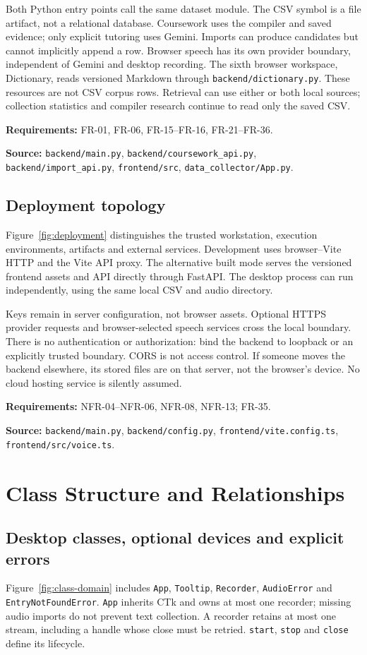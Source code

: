 \documentclass[11pt,a4paper]{article}
\newcommand{\viewtrace}[2]{\par\smallskip\noindent\textbf{Requirements:} #1.\par
  \noindent\textbf{Source:} #2.\par\medskip}
\begin{document}
Both Python entry points call the same dataset module. The CSV symbol is a
file artifact, not a relational database. Coursework uses the compiler and
saved evidence; only explicit tutoring uses Gemini. Imports can produce
candidates but cannot implicitly append a row. Browser speech has its own
provider boundary, independent of Gemini and desktop recording.
The sixth browser workspace, Dictionary, reads versioned Markdown through
\nolinkurl{backend/dictionary.py}. These resources are not CSV corpus rows.
Retrieval can use either or both local sources; collection statistics and
compiler research continue to read only the saved CSV.
\viewtrace{FR-01, FR-06, FR-15--FR-16, FR-21--FR-36}
{\nolinkurl{backend/main.py}, \nolinkurl{backend/coursework_api.py},
\nolinkurl{backend/import_api.py}, \nolinkurl{frontend/src}, \nolinkurl{data_collector/App.py}}

\subsection{Deployment topology}
Figure~\ref{fig:deployment} distinguishes the trusted workstation, execution
environments, artifacts and external services. Development uses browser--Vite
HTTP and the Vite API proxy. The alternative built mode serves the versioned
frontend assets and API directly through FastAPI. The desktop process can run
independently, using the same local CSV and audio directory.

Keys remain in server configuration, not browser assets. Optional HTTPS
provider requests and browser-selected speech services cross the local boundary.
There is no authentication or authorization: bind the backend to loopback or
an explicitly trusted boundary. CORS is not access control. If someone moves
the backend elsewhere, its stored files are on that server, not the browser's
device. No cloud hosting service is silently assumed.
\viewtrace{NFR-04--NFR-06, NFR-08, NFR-13; FR-35}
{\nolinkurl{backend/main.py}, \nolinkurl{backend/config.py},
\nolinkurl{frontend/vite.config.ts}, \nolinkurl{frontend/src/voice.ts}}

\section{Class Structure and Relationships}
\subsection{Desktop classes, optional devices and explicit errors}
Figure~\ref{fig:class-domain} includes \texttt{App}, \texttt{Tooltip},
\texttt{Recorder}, \texttt{AudioError} and \texttt{EntryNotFoundError}.
\texttt{App} inherits CTk and owns at most one recorder; missing audio imports
do not prevent text collection. A recorder retains at most one stream, including
a handle whose close must be retried. \texttt{start}, \texttt{stop} and
\texttt{close} define its lifecycle.
\end{document}
